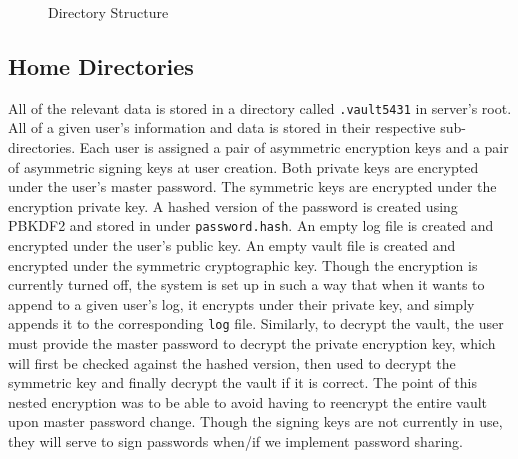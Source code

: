 \documentclass{article}
\begin{document}
\begin{figure}[H]
  \centering
  \begin{subfigure}[b]{0.3\textwidth}
  \end{subfigure}
  \caption{Directory Structure}
  \label{fig:directory_structure}
\end{figure}

\subsection{Home Directories}
\par All of the relevant data is stored in a directory called \texttt{.vault5431} in server's root. All of a given user's information and data is stored in their respective sub-directories. Each user is assigned a pair of asymmetric encryption keys and a pair of asymmetric signing keys at user creation. Both private keys are encrypted under the user's master password. The symmetric keys are encrypted under the encryption private key. A hashed version of the password is created using PBKDF2 and stored in under \texttt{password.hash}. An empty log file is created and encrypted under the user's public key. An empty vault file is created and encrypted under the symmetric cryptographic key. Though the encryption is currently turned off, the system is set up in such a way that when it wants to append to a given user's log, it encrypts under their private key, and simply appends it to the corresponding \texttt{log} file. Similarly, to decrypt the vault, the user must provide the master password to decrypt the private encryption key, which will first be checked against the hashed version, then used to decrypt the symmetric key and finally decrypt the vault if it is correct. The point of this nested encryption was to be able to avoid having to reencrypt the entire vault upon master password change. Though the signing keys are not currently in use, they will serve to sign passwords when/if we implement password sharing.
\end{document}
